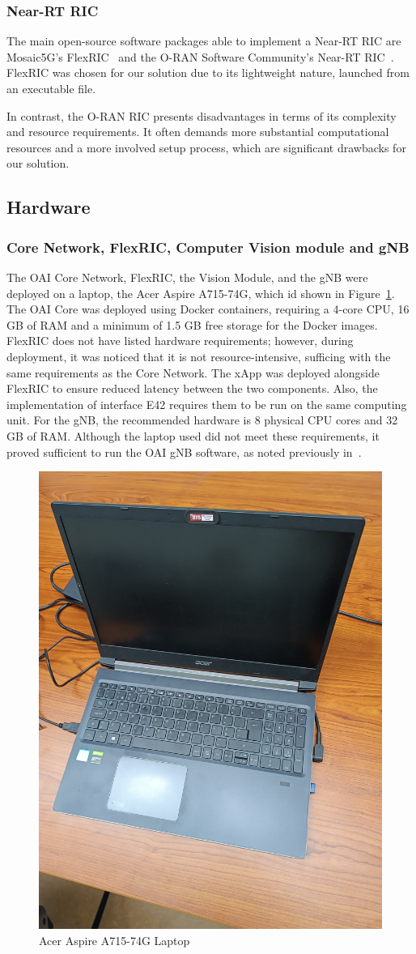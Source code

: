 \subsubsection{Near-RT RIC}
The main open-source software packages able to implement a Near-RT RIC are Mosaic5G’s FlexRIC~\cite{flexric} and the O-RAN Software Community’s Near-RT RIC~\cite{oran-sc}.
FlexRIC was chosen for our solution due to its lightweight nature, launched from an executable file.

In contrast, the O-RAN RIC presents disadvantages in terms of its complexity and resource requirements.
It often demands more substantial computational resources and a more involved setup process, which are significant drawbacks for our solution.

\subsection{Hardware}\label{subsec:hardware}


\subsubsection{Core Network, FlexRIC, Computer Vision module and gNB}
The OAI Core Network, FlexRIC, the Vision Module, and the gNB were deployed on a laptop, the Acer Aspire A715-74G, which id shown in Figure~\ref{fig:computer_acer}.
The OAI Core was deployed using Docker containers, requiring a 4-core CPU, 16 GB of RAM and a minimum of 1.5 GB free storage for the Docker images.
FlexRIC does not have listed hardware requirements; however, during deployment, it was noticed that it is not resource-intensive, sufficing with the same requirements as the Core Network.
The xApp was deployed alongside FlexRIC to ensure reduced latency between the two components.
Also,  the implementation of interface E42 requires them to be run on the same computing unit.
For the gNB, the recommended hardware is 8 physical CPU cores and 32 GB of RAM\@.
Although the laptop used did not meet these requirements, it proved sufficient to run the OAI gNB software, as noted previously in~\cite{queiros2023autonomous}.

\begin{figure}[H]
    \centering
    \includegraphics[width=0.3\linewidth]{figures/acer}
    \caption{Acer Aspire A715-74G Laptop}
    \label{fig:computer_acer}
\end{figure}

